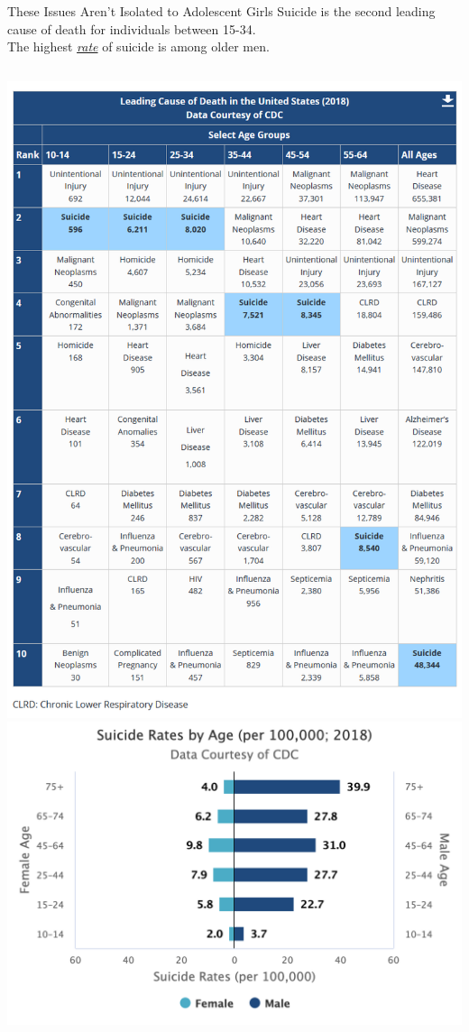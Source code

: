 \documentclass[nobackground,dvipsnames,table]{beamer}
\begin{document}
\begin{frame}{These Issues Aren't Isolated to Adolescent Girls}
    \small
    Suicide is the second leading cause of death for individuals between 15-34.\\
    The highest \underline{\textit{rate}} of suicide is among older men.
    \begin{columns}
            \includegraphics[width=\textwidth]{leading-causes-of-death-suicide-2018}
            \includegraphics[width=\textwidth]{suicide-rates-by-age}
    \end{columns}
\end{frame}
\end{document}
